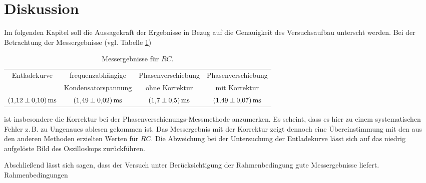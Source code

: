 \section{Diskussion}
Im folgenden Kapitel soll die Aussagekraft der Ergebnisse in Bezug auf die %
Genauigkeit des Versuchsaufbau unterscht werden. %
Bei der Betrachtung der Messergebnisse (vgl. Tabelle \ref{tab:messergebnisse})

\begin{table}
  \centering
  \caption{Messergebnisse für $RC$.}
  \label{tab:messergebnisse}
  \begin{tabular}{cccc}
    \toprule
    {Entladekurve} & {frequenzabhängige} & { Phasenverschiebung  } & {Phasenverschiebung} \\
    & { Kondensatorspannung} & {ohne Korrektur} & {mit Korrektur} \\
    \midrule
    $\SI{1.12\pm0.1}{\milli\second} $ & $\SI{1.49\pm0.02}{\milli\second}$ &
    $\SI{1.7\pm0.5}{\milli\second}$ & $\SI{1.49\pm0.07}{\milli\second}$ \\
    \bottomrule
  \end{tabular}
\end{table}

ist insbesondere die Korrektur bei der Phasenverschienungs-Messmethode anzumerken. %
Es scheint, dass es hier zu einem systematischen Fehler z.\,B. zu Ungenaues ablesen gekommen ist. %
Das Messergebnis mit der Korrektur zeigt dennoch eine Übereinstimmung mit den
aus den anderen Methoden erzielten Werten für $RC$.
Die Abweichung bei der Untersuchung der Entladekurve lässt sich auf das
niedrig aufgelöste Bild des Oszilloskops zurückführen.

Abschließend lässt sich sagen, dass der Versuch unter Berücksichtigung
der Rahmenbedingung gute Messergebnisse liefert. Rahmenbedingungen

